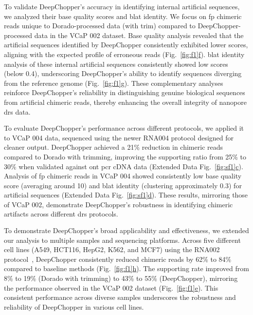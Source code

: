 \documentclass[pdflatex, sn-mathphys-num, lineno]{sn-jnl}%
\newcommand{\figref}[2]{Fig.~\hyperref[#1]{\ref*{#1}#2}}
\newcommand{\edfigref}[2]{Extended Data Fig.~\hyperref[#1]{\ref*{#1}#2}}
\theoremstyle{thmstyleone}%
\theoremstyle{thmstyletwo}%
\theoremstyle{thmstylethree}%
\begin{document}
To validate DeepChopper's accuracy in identifying internal artificial sequences, we analyzed their base quality scores and \gls{blat} identity.
We focus on \gls{fp} chimeric reads unique to Dorado-processed data (with trim) compared to DeepChopper-processed data in the VCaP 002 dataset.
Base quality analysis revealed that the artificial sequences identified by DeepChopper consistently exhibited lower scores, aligning with the expected profile of erroneous reads (\figref{fig:f1}{f}).
\gls{blat} identity analysis of these internal artificial sequences consistently showed low scores (below 0.4), underscoring DeepChopper's ability to identify sequences diverging from the reference genome (\figref{fig:f1}{g}).
These complementary analyses reinforce DeepChopper's reliability in distinguishing genuine biological sequences from artificial chimeric reads, thereby enhancing the overall integrity of nanopore \gls{drs} data.

To evaluate DeepChopper's performance across different protocols, we applied it to VCaP 004 data, sequenced using the newer RNA004 protocol designed for cleaner output.
DeepChopper achieved a 21\% reduction in chimeric reads compared to Dorado with trimming, improving the supporting ratio from 25\% to 30\% when validated against \gls{ont} \gls{pcr} cDNA data (\edfigref{fig:sf1}{c}).
Analysis of \gls{fp} chimeric reads in VCaP 004 showed consistently low base quality score (averaging around 10) and \gls{blat} identity (clustering approximately 0.3) for artificial sequences (\edfigref{fig:sf1}{d}).
These results, mirroring those of VCaP 002, demonstrate DeepChopper's robustness in identifying chimeric artifacts across different \gls{drs} protocols.

To demonstrate DeepChopper's broad applicability and effectiveness, we extended our analysis to multiple samples and sequencing platforms.
Across five different cell lines (A549, HCT116, HepG2, K562, and MCF7) using the RNA002 protocol~\cite{chen2021systematic}, DeepChopper consistently reduced chimeric reads by 62\% to 84\% compared to baseline methods (\figref{fig:f1}{h}).
The supporting rate improved from 8\% to 19\% (Dorado with trimming) to 43\% to 55\% (DeepChopper), mirroring the performance observed in the VCaP 002 dataset (\figref{fig:f1}{e}).
This consistent performance across diverse samples underscores the robustness and reliability of DeepChopper in various cell lines.
\end{document}
